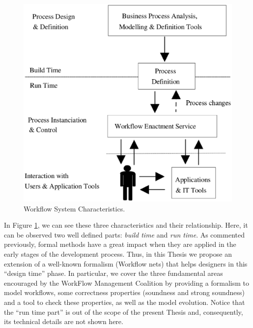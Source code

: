 \begin{figure}
\begin{center}
  \includegraphics[scale=0.25]{Figures/wfmsarquitectura.eps}
\end{center}
  \caption{Workflow System Characteristics.}
  \label{fig:wfms}
\end{figure}

In Figure \ref{fig:wfms}, we can see these three characteristics and their relationship. Here, 
it can be observed two well defined parts: \emph{build time} and \emph{run time}. As commented previously, formal methods have a 
great impact when they are applied in the early stages of the development process. Thus, 
in this Thesis we propose an extension of a well-known formalism (Workflow nets)
that helps designers in this ``design time'' phase. In particular, we cover the three fundamental areas encouraged by the WorkFlow Management Coalition 
by providing a formalism to model workflows, some correctness properties (soundness and strong soundness) and a tool to check these properties, as well as the model 
evolution. Notice that the ``run time part'' is out of the scope of the present Thesis and, consequently, its technical details are not shown here.

